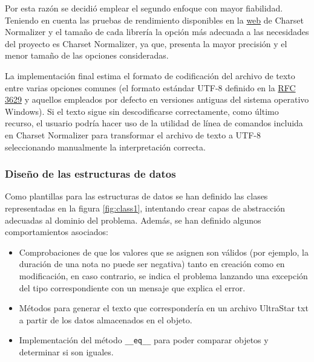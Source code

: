 Por esta razón se decidió emplear el segundo enfoque con mayor fiabilidad. Teniendo en cuenta las pruebas de rendimiento disponibles en la \href{https://github.com/Ousret/charset_normalizer}{web} de Charset Normalizer y el tamaño de cada librería la opción más adecuada a las necesidades del proyecto es Charset Normalizer, ya que, presenta la mayor precisión y el menor tamaño de las opciones consideradas.

La implementación final estima el formato de codificación del archivo de texto entre varias opciones comunes (el formato estándar UTF-8 definido en la \href{https://www.rfc-editor.org/rfc/rfc3629}{RFC 3629} y aquellos empleados por defecto en versiones antiguas del sistema operativo Windows). Si el texto sigue sin descodificarse correctamente, como último recurso, el usuario podría hacer uso de la utilidad de línea de comandos incluida en Charset Normalizer para transformar el archivo de texto a UTF-8 seleccionando manualmente la interpretación correcta.

\subsubsection{Diseño de las estructuras de datos}

Como plantillas para las estructuras de datos se han definido las clases representadas en la figura \ref{fig:class1}, intentando crear capas de abstracción adecuadas al dominio del problema. Además, se han definido algunos comportamientos asociados:
\begin{itemize}
	\item{Comprobaciones de que los valores que se asignen son válidos (por ejemplo, la duración de una nota no puede ser negativa) tanto en creación como en modificación, en caso contrario, se indica el problema lanzando una excepción del tipo correspondiente con un mensaje que explica el error.}
	\item{Métodos para generar el texto que correspondería en un archivo UltraStar txt a partir de los datos almacenados en el objeto.}
	\item{Implementación del método \texttt{\_\_eq\_\_} para poder comparar objetos  y determinar si son iguales.}
\end{itemize}

